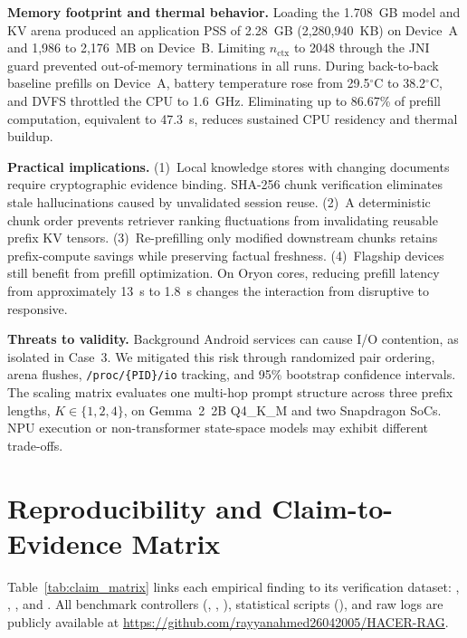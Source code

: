 \documentclass[10pt,conference]{IEEEtran}
\begin{document}
\textbf{Memory footprint and thermal behavior.} Loading the 1.708~GB model and KV arena produced an application PSS of 2.28~GB (2,280,940~KB) on Device~A and 1,986 to 2,176~MB on Device~B. Limiting $n_{\text{ctx}}$ to 2048 through the JNI guard prevented out-of-memory terminations in all runs. During back-to-back baseline prefills on Device~A, battery temperature rose from 29.5$^\circ$C to 38.2$^\circ$C, and DVFS throttled the CPU to 1.6~GHz. Eliminating up to 86.67\% of prefill computation, equivalent to 47.3~s, reduces sustained CPU residency and thermal buildup.

\textbf{Practical implications.}
(1)~Local knowledge stores with changing documents require cryptographic evidence binding. SHA-256 chunk verification eliminates stale hallucinations caused by unvalidated session reuse.
(2)~A deterministic chunk order prevents retriever ranking fluctuations from invalidating reusable prefix KV tensors.
(3)~Re-prefilling only modified downstream chunks retains prefix-compute savings while preserving factual freshness.
(4)~Flagship devices still benefit from prefill optimization. On Oryon cores, reducing prefill latency from approximately 13~s to 1.8~s changes the interaction from disruptive to responsive.

\textbf{Threats to validity.} Background Android services can cause I/O contention, as isolated in Case~3. We mitigated this risk through randomized pair ordering, arena flushes, \texttt{/proc/\allowbreak\{PID\}/\allowbreak io} tracking, and 95\% bootstrap confidence intervals. The scaling matrix evaluates one multi-hop prompt structure across three prefix lengths, $K\in\{1,2,4\}$, on Gemma~2~2B Q4\_K\_M and two Snapdragon SoCs. NPU execution or non-transformer state-space models may exhibit different trade-offs.

\section{Reproducibility and Claim-to-Evidence Matrix}
\label{sec:reproducibility}
Table~\ref{tab:claim_matrix} links each empirical finding to its verification dataset: , , , and . All benchmark controllers (, , ), statistical scripts (), and raw logs are publicly available at \url{https://github.com/rayyanahmed26042005/HACER-RAG}.
\end{document}
